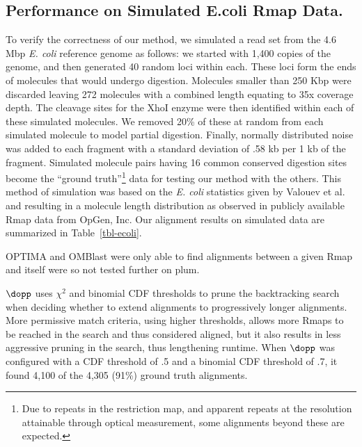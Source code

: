 \documentclass[doctor]{thesis}
\begin{document}
\subsection{Performance on Simulated E.coli Rmap Data.} \label{sec:ecoli}

To verify the correctness of our method, we simulated a read set from the 4.6 Mbp \emph{E. coli} reference genome as follows:  we started with 1,400 copies of the genome, and then generated 40 random loci within each. These loci form the ends of molecules that would undergo digestion.  Molecules smaller than 250 Kbp were discarded leaving 272 molecules with a combined length equating to 35x coverage depth.  The cleavage sites for the XhoI enzyme were then identified within each of these simulated molecules. We removed 20\% of these at random from each simulated molecule to model partial digestion.  Finally, normally distributed noise was added to each fragment with a standard deviation of .58 kb per 1 kb of the fragment.  Simulated molecule pairs having 16 common conserved digestion sites become the ``ground truth''\footnote{Due to repeats in the restriction map, and apparent repeats at the resolution attainable through optical measurement, some alignments beyond these are expected.} data for testing our method with the others.  This method of simulation was based on the \emph{E. coli} statistics given by Valouev et al.~\cite{valouev2006algorithm} and resulting in a molecule length distribution as observed in publicly available Rmap data from OpGen, Inc.
Our  alignment results on simulated data are summarized in Table~\ref{tbl-ecoli}.  

OPTIMA and OMBlast were only able to find alignments between a given Rmap and itself were so not tested further on plum.  

$\dopp$ uses $\chi^2$ and binomial CDF thresholds to prune the backtracking search when deciding whether to extend alignments to progressively longer alignments.  More permissive match criteria, using higher thresholds, allows  more Rmaps to be reached in the search and thus considered aligned, but it also results in less aggressive pruning in the search, thus lengthening runtime.  When $\dopp$ was configured with a CDF threshold of .5 and a binomial CDF threshold of .7, it found 4,100 of the 4,305 (91\%) ground truth alignments. 
\end{document}
